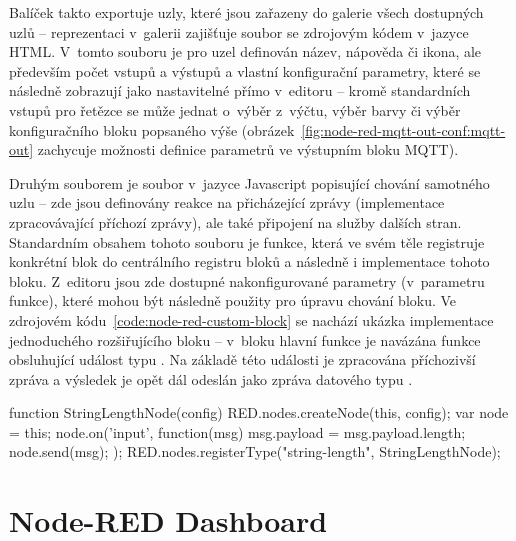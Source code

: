 Balíček takto exportuje uzly, které jsou zařazeny do galerie všech dostupných uzlů -- reprezentaci v~galerii zajišťuje
soubor se zdrojovým kódem v~jazyce HTML.
V~tomto souboru je pro uzel definován název, nápověda či ikona, ale především počet vstupů a výstupů a vlastní
konfigurační parametry, které se následně zobrazují jako nastavitelné přímo v~editoru -- kromě standardních vstupů
pro řetězce se může jednat o~výběr z~výčtu, výběr barvy či výběr konfiguračního bloku popsaného výše
(obrázek~\ref{fig:node-red-mqtt-out-conf:mqtt-out} zachycuje možnosti definice parametrů ve výstupním bloku MQTT).

Druhým souborem je soubor v~jazyce Javascript popisující chování samotného uzlu -- zde jsou definovány reakce na
přicházející zprávy (implementace zpracovávající příchozí zprávy), ale také připojení na služby dalších stran.
Standardním obsahem tohoto souboru je funkce, která ve svém těle registruje konkrétní blok do centrálního registru
bloků a následně i implementace tohoto bloku.
Z~editoru jsou zde dostupné nakonfigurované parametry (v~parametru funkce), které mohou být následně použity pro
úpravu chování bloku.
Ve zdrojovém kódu~\ref{code:node-red-custom-block} se nachází ukázka implementace jednoduchého rozšiřujícího bloku --
v~bloku hlavní funkce je navázána funkce obsluhující událost typu .
Na základě této události je zpracována příchozivší zpráva a výsledek je opět dál odeslán jako zpráva datového typu
.

\begin{code}[%
    caption={Ukázka implementace vlastního rozšiřujícího bloku do nástroje Node-RED -- uzel s~jedním vstupem a
výstupem, jehož funkcí je určení délky příchozí zprávy (řetězce).
\emph{Implementace pro jednoduchost neobsahuje kontrolu datových typů či práci s~konfiguračními parametry uzlu.}},
    label=code:node-red-custom-block,
    language=Javascript
]
function StringLengthNode(config) {
    RED.nodes.createNode(this, config);
    var node = this;
    node.on('input', function(msg) {
        msg.payload = msg.payload.length;
        node.send(msg);
    });
}
RED.nodes.registerType("string-length", StringLengthNode);
\end{code}

\section{Node-RED Dashboard}\label{sec:node-red-dashboard}

